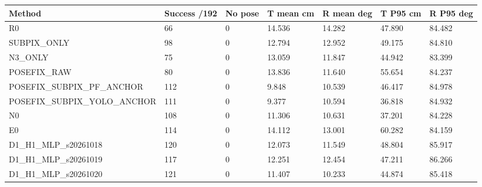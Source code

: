 \begin{tabular}{lllllll}
\hline
Method & Success /192 & No pose & T mean cm & R mean deg & T P95 cm & R P95 deg \\
\hline
R0 & 66 & 0 & 14.536 & 14.282 & 47.890 & 84.482 \\
SUBPIX\_ONLY & 98 & 0 & 12.794 & 12.952 & 49.175 & 84.810 \\
N3\_ONLY & 75 & 0 & 13.059 & 11.847 & 44.942 & 83.399 \\
POSEFIX\_RAW & 80 & 0 & 13.836 & 11.640 & 55.654 & 84.237 \\
POSEFIX\_SUBPIX\_PF\_ANCHOR & 112 & 0 & 9.848 & 10.539 & 46.417 & 84.978 \\
POSEFIX\_SUBPIX\_YOLO\_ANCHOR & 111 & 0 & 9.377 & 10.594 & 36.818 & 84.932 \\
N0 & 108 & 0 & 11.306 & 10.631 & 37.201 & 84.228 \\
E0 & 114 & 0 & 14.112 & 13.001 & 60.282 & 84.159 \\
D1\_H1\_MLP\_s20261018 & 120 & 0 & 12.073 & 11.549 & 48.804 & 85.917 \\
D1\_H1\_MLP\_s20261019 & 117 & 0 & 12.251 & 12.454 & 47.211 & 86.266 \\
D1\_H1\_MLP\_s20261020 & 121 & 0 & 11.407 & 10.233 & 44.874 & 85.418 \\
\hline
\end{tabular}
